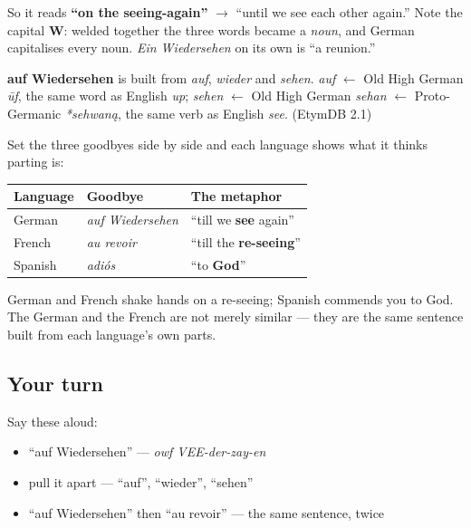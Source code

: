 So it reads \textbf{\textquotedblleft{}on the seeing-again\textquotedblright{}} $\to$ \textquotedblleft{}until we see each other again.\textquotedblright{} Note the capital \textbf{W}: welded together the three words became a \emph{noun}, and German capitalises every noun. \emph{Ein Wiedersehen} on its own is \textquotedblleft{}a reunion.\textquotedblright{}

\begin{cousinweb}
\textbf{auf Wiedersehen} is built from \emph{auf}, \emph{wieder} and \emph{sehen}. \emph{auf} $\leftarrow$ Old High German \emph{ūf}, the same word as English \emph{up}; \emph{sehen} $\leftarrow$ Old High German \emph{sehan} $\leftarrow$ Proto-Germanic \emph{*sehwaną}, the same verb as English \emph{see}. (EtymDB 2.1)
\end{cousinweb}

\begin{culture}
Set the three goodbyes side by side and each language shows what it thinks parting is:

\noindent
\begin{tabularx}{\linewidth}{@{}>{\raggedright\arraybackslash}X>{\raggedright\arraybackslash}X>{\raggedright\arraybackslash}X@{}}
\toprule
\textbf{Language} & \textbf{Goodbye} & \textbf{The metaphor} \\
\midrule
German & \emph{auf Wiedersehen} & \textquotedblleft{}till we \textbf{see} again\textquotedblright{} \\
French & \emph{au revoir} & \textquotedblleft{}till the \textbf{re-seeing}\textquotedblright{} \\
Spanish & \emph{adiós} & \textquotedblleft{}to \textbf{God}\textquotedblright{} \\
\bottomrule
\end{tabularx}

German and French shake hands on a re-seeing; Spanish commends you to God. The German and the French are not merely similar — they are the same sentence built from each language's own parts.
\end{culture}

\subsection*{Your turn}
Say these aloud:

\begin{itemize}
\raggedright
  \item \textquotedblleft{}auf Wiedersehen\textquotedblright{} — \emph{owf VEE-der-zay-en}
  \item pull it apart — \textquotedblleft{}auf\textquotedblright{}, \textquotedblleft{}wieder\textquotedblright{}, \textquotedblleft{}sehen\textquotedblright{}
  \item \textquotedblleft{}auf Wiedersehen\textquotedblright{} then \textquotedblleft{}au revoir\textquotedblright{} — the same sentence, twice
\end{itemize}

